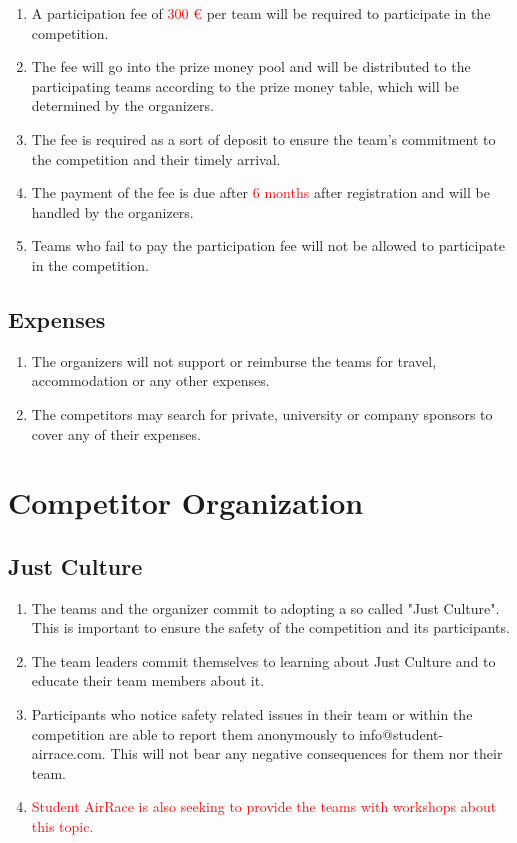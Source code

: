     \begin{enumerate}
    \item A participation fee of \textcolor{red}{300 \euro{}} per team will be required to participate in the competition.
    \item The fee will go into the prize money pool and will be distributed to the participating teams according to the prize money table, which will be determined by the organizers.
    \item The fee is required as a sort of deposit to ensure the team's commitment to the competition and their timely arrival.
    \item The payment of the fee is due after \textcolor{red}{6 months} after registration and will be handled by the organizers.
    \item Teams who fail to pay the participation fee will not be allowed to participate in the competition.
    \end{enumerate}

    \subsection{Expenses}
    \begin{enumerate}
      \item The organizers will not support or reimburse the teams for travel, accommodation or any other expenses. 
      \item The competitors may search for private, university or company sponsors to cover any of their expenses.
    \end{enumerate}

    \section{Competitor Organization}

    \subsection{Just Culture}
    \begin{enumerate}
      \item The teams and the organizer commit to adopting a so called "Just Culture". This is important to ensure the safety of the competition and its participants.
      \item The team leaders commit themselves to learning about Just Culture and to educate their team members about it.
      \item Participants who notice safety related issues in their team or within the competition are able to report them anonymously  to info@student-airrace.com. This will not bear any
      negative consequences for them nor their team. 
      \item \textcolor{red}{Student AirRace is also seeking to provide the teams with workshops about this topic.}
    \end{enumerate}

